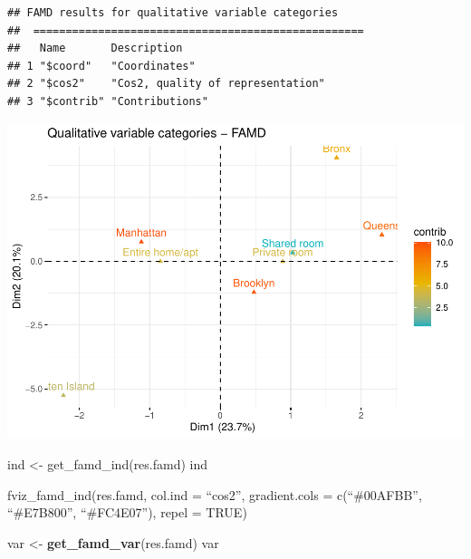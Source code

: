 \documentclass[
]{article}
\newenvironment{Shaded}{\begin{snugshade}}{\end{snugshade}}
\newcommand{\DataTypeTok}[1]{\textcolor[rgb]{0.13,0.29,0.53}{#1}}
\newcommand{\KeywordTok}[1]{\textcolor[rgb]{0.13,0.29,0.53}{\textbf{#1}}}
\newcommand{\NormalTok}[1]{#1}
\newcommand{\StringTok}[1]{\textcolor[rgb]{0.31,0.60,0.02}{#1}}
\begin{document}
\begin{verbatim}
## FAMD results for qualitative variable categories 
##  ===================================================
##   Name       Description                      
## 1 "$coord"   "Coordinates"                    
## 2 "$cos2"    "Cos2, quality of representation"
## 3 "$contrib" "Contributions"
\end{verbatim}

\begin{Shaded}
\end{Shaded}

\includegraphics{project-code_files/figure-latex/unnamed-chunk-34-1.pdf}

ind \textless- get\_famd\_ind(res.famd) ind

fviz\_famd\_ind(res.famd, col.ind = ``cos2'', gradient.cols =
c(``\#00AFBB'', ``\#E7B800'', ``\#FC4E07''), repel = TRUE)

\begin{Shaded}
\begin{Highlighting}[]
\NormalTok{var <-}\StringTok{ }\KeywordTok{get_famd_var}\NormalTok{(res.famd)}
\NormalTok{var}
\end{Highlighting}
\end{Shaded}
\end{document}
